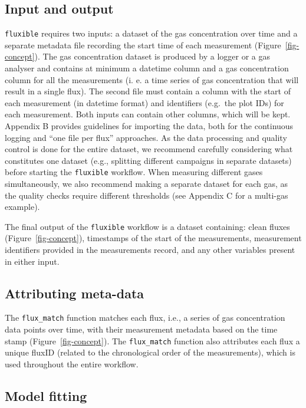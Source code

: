 \documentclass[
  letterpaper,
  DIV=11,
  numbers=noendperiod]{scrartcl}
\begin{document}
\subsection{Input and output}\label{input-and-output}

\texttt{fluxible} requires two inputs: a dataset of the gas
concentration over time and a separate metadata file recording the start
time of each measurement (Figure~\ref{fig-concept}). The gas
concentration dataset is produced by a logger or a gas analyser and
contains at minimum a datetime column and a gas concentration column for
all the measurements (i. e. a time series of gas concentration that will
result in a single flux). The second file must contain a column with the
start of each measurement (in datetime format) and identifiers (e.g.~the
plot IDs) for each measurement. Both inputs can contain other columns,
which will be kept. Appendix B provides guidelines for importing the
data, both for the continuous logging and ``one file per flux''
approaches. As the data processing and quality control is done for the
entire dataset, we recommend carefully considering what constitutes one
dataset (e.g., splitting different campaigns in separate datasets)
before starting the \texttt{fluxible} workflow. When measuring different
gases simultaneously, we also recommend making a separate dataset for
each gas, as the quality checks require different thresholds (see
Appendix C for a multi-gas example).

The final output of the \texttt{fluxible} workflow is a dataset
containing: clean fluxes (Figure~\ref{fig-concept}), timestamps of the
start of the measurements, measurement identifiers provided in the
measurements record, and any other variables present in either input.

\subsection{Attributing meta-data}\label{attributing-meta-data}

The \texttt{flux\_match} function matches each flux, i.e., a series of
gas concentration data points over time, with their measurement metadata
based on the time stamp (Figure~\ref{fig-concept}). The
\texttt{flux\_match} function also attributes each flux a unique fluxID
(related to the chronological order of the measurements), which is used
throughout the entire workflow.

\subsection{Model fitting}\label{model-fitting}
\end{document}
